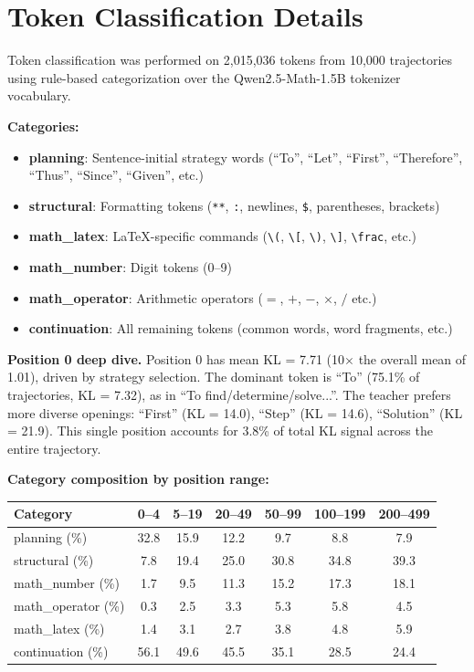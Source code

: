 \documentclass[10pt]{article}
\begin{document}
\section{Token Classification Details}
\label{app:token_class}

Token classification was performed on 2,015,036 tokens from 10,000 trajectories using rule-based categorization over the Qwen2.5-Math-1.5B tokenizer vocabulary.

\textbf{Categories:}
\begin{itemize}
\item \textbf{planning}: Sentence-initial strategy words (``To'', ``Let'', ``First'', ``Therefore'', ``Thus'', ``Since'', ``Given'', etc.)
\item \textbf{structural}: Formatting tokens (\texttt{**}, \texttt{:}, newlines, \texttt{\$}, parentheses, brackets)
\item \textbf{math\_latex}: LaTeX-specific commands (\texttt{\textbackslash(}, \texttt{\textbackslash[}, \texttt{\textbackslash)}, \texttt{\textbackslash]}, \texttt{\textbackslash frac}, etc.)
\item \textbf{math\_number}: Digit tokens (0--9)
\item \textbf{math\_operator}: Arithmetic operators ($=$, $+$, $-$, $\times$, $/$ etc.)
\item \textbf{continuation}: All remaining tokens (common words, word fragments, etc.)
\end{itemize}

\textbf{Position 0 deep dive.}
Position 0 has mean KL = 7.71 (10$\times$ the overall mean of 1.01), driven by strategy selection.
The dominant token is ``To'' (75.1\% of trajectories, KL = 7.32), as in ``To find/determine/solve...''.
The teacher prefers more diverse openings: ``First'' (KL = 14.0), ``Step'' (KL = 14.6), ``Solution'' (KL = 21.9).
This single position accounts for 3.8\% of total KL signal across the entire trajectory.

\textbf{Category composition by position range:}

\begin{table}[h]
\centering
\small
\begin{tabular}{@{}lcccccc@{}}
\toprule
\textbf{Category} & \textbf{0--4} & \textbf{5--19} & \textbf{20--49} & \textbf{50--99} & \textbf{100--199} & \textbf{200--499} \\
\midrule
planning (\%)        & 32.8 & 15.9 & 12.2 & 9.7 & 8.8 & 7.9 \\
structural (\%)      & 7.8  & 19.4 & 25.0 & 30.8 & 34.8 & 39.3 \\
math\_number (\%)    & 1.7  & 9.5  & 11.3 & 15.2 & 17.3 & 18.1 \\
math\_operator (\%)  & 0.3  & 2.5  & 3.3  & 5.3  & 5.8  & 4.5 \\
math\_latex (\%)     & 1.4  & 3.1  & 2.7  & 3.8  & 4.8  & 5.9 \\
continuation (\%)    & 56.1 & 49.6 & 45.5 & 35.1 & 28.5 & 24.4 \\
\bottomrule
\end{tabular}
\end{table}
\end{document}
